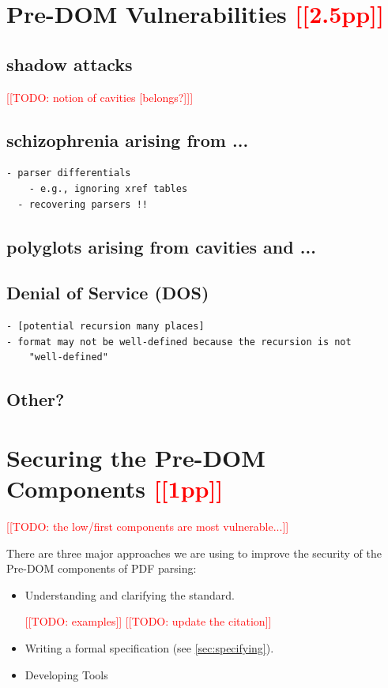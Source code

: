 \documentclass[conference,12pt]{IEEEtran}
\newcommand{\note}[1]{\noteYes{#1}}
\newcommand{\noteYes}[1]{\textcolor{red}{[[#1]]}}
\newcommand{\todo}[1]{\note{TODO: #1}}
\begin{document}
\section{Pre-DOM Vulnerabilities \note{2.5pp}}
\label{sec:predom-vulnerabilities}

\subsection{shadow attacks}
\todo{notion of cavities [belongs?]}

\subsection{schizophrenia arising from ...}
\begin{lstlisting}[style=meta]
  - parser differentials
    - e.g., ignoring xref tables
  - recovering parsers !!
\end{lstlisting}

\subsection{polyglots arising from cavities and ...}

\subsection{Denial of Service (DOS)}

\begin{lstlisting}[style=meta]
- [potential recursion many places]
- format may not be well-defined because the recursion is not
    "well-defined"
\end{lstlisting}

\subsection{Other?}

\section{Securing the Pre-DOM Components \note{1pp}}
\label{sec:securing}

\todo{the low/first components are most vulnerable...}
     
There are three major approaches we are using to improve the security of the
Pre-DOM components of PDF parsing:
\begin{itemize}
 \item Understanding and clarifying the standard.
  
   \todo{examples}
   \cite{pdfspec} \todo{update the citation}    
 \item Writing a formal specification (see \cref{sec:specifying}).

 \item Developing Tools
\end{itemize}
\end{document}

